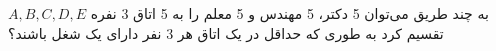 \p    
به چند طریق می‌توان 5 دکتر، 5 مهندس و 5 معلم را به 5 اتاق 3 نفره 
$ A,B,C,D,E$
تقسیم کرد به طوری که
حداقل در یک اتاق هر 3 نفر دارای یک شغل باشند؟

